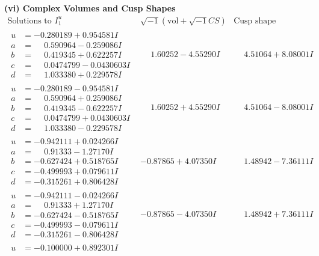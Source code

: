 \documentclass[1p]{elsarticle_modified}
\theoremstyle{definition}
\newcommand{\I}{\sqrt{-1}}
\begin{document}
\newpage\flushleft \textbf{(vi) Complex Volumes and Cusp Shapes}
$$\begin{array}{c|c|c}  
\text{Solutions to }I^u_{1}& \I (\text{vol} + \sqrt{-1}CS) & \text{Cusp shape}\\
 \hline 
\begin{aligned}
u &= -0.280189 + 0.954581 I \\
a &= \phantom{-}0.590964 - 0.259086 I \\
b &= \phantom{-}0.419345 + 0.622257 I \\
c &= \phantom{-}0.0474799 - 0.0430603 I \\
d &= \phantom{-}1.033380 + 0.229578 I\end{aligned}
 & \phantom{-}1.60252 - 4.55290 I & \phantom{-}4.51064 + 8.08001 I \\ \hline\begin{aligned}
u &= -0.280189 - 0.954581 I \\
a &= \phantom{-}0.590964 + 0.259086 I \\
b &= \phantom{-}0.419345 - 0.622257 I \\
c &= \phantom{-}0.0474799 + 0.0430603 I \\
d &= \phantom{-}1.033380 - 0.229578 I\end{aligned}
 & \phantom{-}1.60252 + 4.55290 I & \phantom{-}4.51064 - 8.08001 I \\ \hline\begin{aligned}
u &= -0.942111 + 0.024266 I \\
a &= \phantom{-}0.91333 - 1.27170 I \\
b &= -0.627424 + 0.518765 I \\
c &= -0.499993 + 0.079611 I \\
d &= -0.315261 + 0.806428 I\end{aligned}
 & -0.87865 + 4.07350 I & \phantom{-}1.48942 - 7.36111 I \\ \hline\begin{aligned}
u &= -0.942111 - 0.024266 I \\
a &= \phantom{-}0.91333 + 1.27170 I \\
b &= -0.627424 - 0.518765 I \\
c &= -0.499993 - 0.079611 I \\
d &= -0.315261 - 0.806428 I\end{aligned}
 & -0.87865 - 4.07350 I & \phantom{-}1.48942 + 7.36111 I \\ \hline\begin{aligned}
u &= -0.100000 + 0.892301 I \\

\end{aligned}
\end{array}$$
\end{document}
